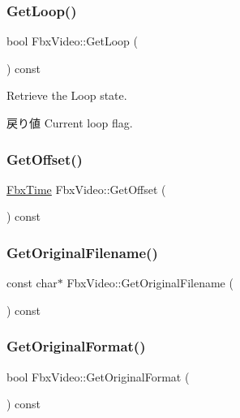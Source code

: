 \subsubsection{\texorpdfstring{Get\+Loop()}{GetLoop()}}
{\footnotesize\ttfamily bool Fbx\+Video\+::\+Get\+Loop (\begin{DoxyParamCaption}{ }\end{DoxyParamCaption}) const}

Retrieve the Loop state. \begin{DoxyReturn}{戻り値}
Current loop flag. 
\end{DoxyReturn}
\mbox{\label{class_fbx_video_ac4a2e039c73ba16c80f3c538a739a364}} 
\subsubsection{\texorpdfstring{Get\+Offset()}{GetOffset()}}
{\footnotesize\ttfamily \hyperlink{class_fbx_time}{Fbx\+Time} Fbx\+Video\+::\+Get\+Offset (\begin{DoxyParamCaption}{ }\end{DoxyParamCaption}) const}

\mbox{\label{class_fbx_video_a8657651afd89c2f7811b7056ac8346c9}} 
\subsubsection{\texorpdfstring{Get\+Original\+Filename()}{GetOriginalFilename()}}
{\footnotesize\ttfamily const char$\ast$ Fbx\+Video\+::\+Get\+Original\+Filename (\begin{DoxyParamCaption}{ }\end{DoxyParamCaption}) const}

\mbox{\label{class_fbx_video_aa267c61d456e3cbb8317ac85eac1e979}} 
\subsubsection{\texorpdfstring{Get\+Original\+Format()}{GetOriginalFormat()}}
{\footnotesize\ttfamily bool Fbx\+Video\+::\+Get\+Original\+Format (\begin{DoxyParamCaption}{ }\end{DoxyParamCaption}) const}

